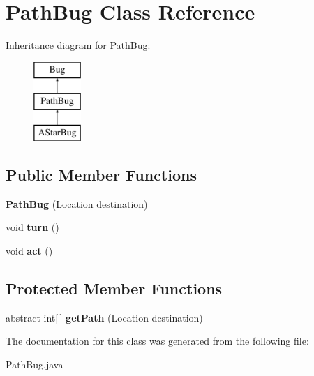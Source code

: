 \hypertarget{classPathBug}{\section{Path\-Bug Class Reference}
\label{classPathBug}
}
Inheritance diagram for Path\-Bug\-:\begin{figure}[H]
\begin{center}
\leavevmode
\includegraphics[height=3.000000cm]{classPathBug}
\end{center}
\end{figure}
\subsection*{Public Member Functions}
\begin{DoxyCompactItemize}
\item 
\hypertarget{classPathBug_a26ac068b0f789add7c3d0f32ec8c0b98}{{\bfseries Path\-Bug} (Location destination)}\label{classPathBug_a26ac068b0f789add7c3d0f32ec8c0b98}

\item 
\hypertarget{classPathBug_a5a0980aac2f4ba3eb97ade9de758d517}{void {\bfseries turn} ()}\label{classPathBug_a5a0980aac2f4ba3eb97ade9de758d517}

\item 
\hypertarget{classPathBug_a1a6abdca2f1c4892320fbca8a0a8b5b7}{void {\bfseries act} ()}\label{classPathBug_a1a6abdca2f1c4892320fbca8a0a8b5b7}

\end{DoxyCompactItemize}
\subsection*{Protected Member Functions}
\begin{DoxyCompactItemize}
\item 
\hypertarget{classPathBug_a75ceded2dc68b195d018417553f7a8d8}{abstract int\mbox{[}$\,$\mbox{]} {\bfseries get\-Path} (Location destination)}\label{classPathBug_a75ceded2dc68b195d018417553f7a8d8}

\end{DoxyCompactItemize}


The documentation for this class was generated from the following file\-:\begin{DoxyCompactItemize}
\item 
Path\-Bug.\-java\end{DoxyCompactItemize}
